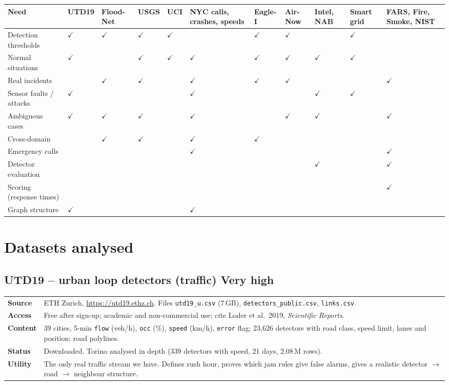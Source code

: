 \documentclass[10pt,a4paper]{article}
\makeatletter
\newcommand{\code}[1]{\texttt{#1}}
\newcommand{\VHIGH}{\textbf{\textcolor{hi}{Very high}}}
\newcommand{\yes}{$\checkmark$}
\newcommand{\facts}[5]{%
\noindent\begin{tabularx}{\textwidth}{@{}L{2.6cm}Y@{}}
\textbf{Source} & #1\\
\textbf{Access} & #2\\
\textbf{Content} & #3\\
\textbf{Status} & #4\\
\textbf{Utility} & #5\\
\end{tabularx}\par\smallskip}
\makeatother
\begin{document}
{\footnotesize
{}
\begin{tabularx}{\textwidth}{@{}L{2.9cm}*{10}{>{\centering\arraybackslash}X}@{}}
\toprule
\textbf{Need} & \textbf{UTD19} & \textbf{Flood-Net} & \textbf{USGS} & \textbf{UCI} & \textbf{NYC calls, crashes, speeds} & \textbf{Eagle-I} & \textbf{Air-Now} & \textbf{Intel, NAB} & \textbf{Smart grid} & \textbf{FARS, Fire, Smoke, NIST}\\
\midrule
Detection thresholds & \yes & \yes & \yes & \yes & & \yes & \yes & & \yes & \\
Normal situations & \yes & & \yes & \yes & \yes & \yes & \yes & \yes & \yes & \\
Real incidents & & \yes & \yes & & \yes & \yes & \yes & & & \yes\\
Sensor faults / attacks & \yes & & & & \yes & & & \yes & \yes & \\
Ambiguous cases & \yes & \yes & \yes & & \yes & & \yes & \yes & & \yes\\
Cross-domain & & \yes & \yes & & \yes & \yes & & & & \\
Emergency calls & & & & & \yes & & & & & \yes\\
Detector evaluation & & & & & & & & \yes & & \yes\\
Scoring (response times) & & & & & & & & & & \yes\\
Graph structure & \yes & & & & \yes & & & & & \\
\bottomrule
\end{tabularx}
}

\clearpage
\section{Datasets analysed}

\subsection{UTD19 -- urban loop detectors (traffic) \hfill \VHIGH}
\facts{ETH Zurich, \url{https://utd19.ethz.ch}. Files \code{utd19\_u.csv} (7\,GB), \code{detectors\_public.csv}, \code{links.csv}.}
{Free after sign-up; academic and non-commercial use; cite Loder et al.\ 2019, \textit{Scientific Reports}.}
{39 cities, 5-min \code{flow} (veh/h), \code{occ} (\%), \code{speed} (km/h), \code{error} flag; 23,626 detectors with road class, speed limit, lanes and position; road polylines.}
{Downloaded. Torino analysed in depth (339 detectors with speed, 21 days, 2.08\,M rows).}
{The only real traffic stream we have. Defines rush hour, proves which jam rules give false alarms, gives a realistic detector $\rightarrow$ road $\rightarrow$ neighbour structure.}
\end{document}
